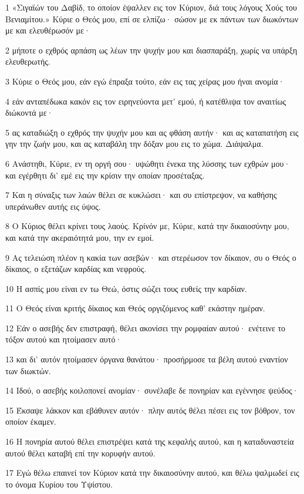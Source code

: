 \par 1 «Σιγαϊών του Δαβίδ, το οποίον έψαλλεν εις τον Κύριον, διά τους λόγους Χούς του Βενιαμίτου.» Κύριε ο Θεός μου, επί σε ελπίζω· σώσον με εκ πάντων των διωκόντων με και ελευθέρωσόν με·
\par 2 μήποτε ο εχθρός αρπάση ως λέων την ψυχήν μου και διασπαράξη, χωρίς να υπάρξη ελευθερωτής.
\par 3 Κύριε ο Θεός μου, εάν εγώ έπραξα τούτο, εάν εις τας χείρας μου ήναι ανομία·
\par 4 εάν ανταπέδωκα κακόν εις τον ειρηνεύοντα μετ' εμού, ή κατέθλιψα τον αναιτίως διώκοντά με·
\par 5 ας καταδιώξη ο εχθρός την ψυχήν μου και ας φθάση αυτήν· και ας καταπατήση εις γην την ζωήν μου, και ας καταβάλη την δόξαν μου εις το χώμα. Διάψαλμα.
\par 6 Ανάστηθι, Κύριε, εν τη οργή σου· υψώθητι ένεκα της λύσσης των εχθρών μου· και εγέρθητι δι' εμέ εις την κρίσιν την οποίαν προσέταξας.
\par 7 Και η σύναξις των λαών θέλει σε κυκλώσει· και συ επίστρεψον, να καθήσης υπεράνωθεν αυτής εις ύψος.
\par 8 Ο Κύριος θέλει κρίνει τους λαούς. Κρίνόν με, Κύριε, κατά την δικαιοσύνην μου, και κατά την ακεραιότητά μου, την εν εμοί.
\par 9 Ας τελειώση πλέον η κακία των ασεβών· και στερέωσον τον δίκαιον, συ ο Θεός ο δίκαιος, ο εξετάζων καρδίας και νεφρούς.
\par 10 Η ασπίς μου είναι εν τω Θεώ, όστις σώζει τους ευθείς την καρδίαν.
\par 11 Ο Θεός είναι κριτής δίκαιος και Θεός οργιζόμενος καθ' εκάστην ημέραν.
\par 12 Εάν ο ασεβής δεν επιστραφή, θέλει ακονίσει την ρομφαίαν αυτού· ενέτεινε το τόξον αυτού και ητοίμασεν αυτό·
\par 13 και δι' αυτόν ητοίμασεν όργανα θανάτου· προσήρμοσε τα βέλη αυτού εναντίον των διωκτών.
\par 14 Ιδού, ο ασεβής κοιλοπονεί ανομίαν· συνέλαβε δε πονηρίαν και εγέννησε ψεύδος·
\par 15 Έκσαψε λάκκον και εβάθυνεν αυτόν· πλην αυτός θέλει πέσει εις τον βόθρον, τον οποίον έκαμεν.
\par 16 Η πονηρία αυτού θέλει επιστρέψει κατά της κεφαλής αυτού, και η καταδυναστεία αυτού θέλει καταβή επί την κορυφήν αυτού.
\par 17 Εγώ θέλω επαινεί τον Κύριον κατά την δικαιοσύνην αυτού, και θέλω ψαλμωδεί εις το όνομα Κυρίου του Υψίστου.

